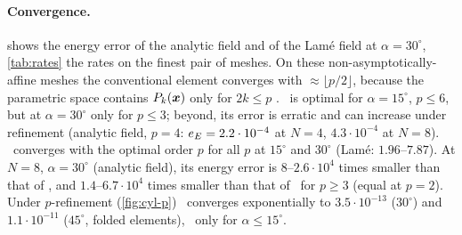 \begin{table}[t]
  \centering\small
  \caption{Thick cylinder, polynomial field (degree 5): maximum relative nodal error over $N=1,\dots,8$
    and $p=5,\dots,8$; in parentheses the number of rejected cases (singular interpolation matrix).}
  \label{tab:cylpoly}
  
\end{table}

\paragraph{Convergence.}  shows the energy error of the analytic field and of
the Lam\'e field at $\alpha=30^\circ$, \cref{tab:rates} the rates on the finest pair of meshes. On
these non-asymptotically-affine meshes the conventional element converges with
$\approx\lfloor p/2\rfloor$, because the parametric space contains $P_k(\bm{x})$ only for $2k\le p$
\cite{Arnold2002Approximation}. \PM\ is optimal for $\alpha=15^\circ$, $p\le6$, but at
$\alpha=30^\circ$ only for $p\le3$; beyond, its error is erratic and can increase under refinement
(analytic field, $p=4$: $e_{E}=2.2\cdot10^{-4}$ at $N=4$, $4.3\cdot10^{-4}$ at $N=8$). \PH\ converges with the
optimal order $p$ for all $p$ at $15^\circ$ and $30^\circ$ (Lam\'e: $1.96$--$7.87$). At $N=8$,
$\alpha=30^\circ$ (analytic field), its energy error is $8$--$2.6\cdot10^4$ times smaller than that of \PP,
and $1.4$--$6.7\cdot10^4$ times smaller than that of \PM\ for $p\ge3$ (equal at $p=2$). Under
$p$-refinement (\cref{fig:cyl-p}) \PH\ converges exponentially to $3.5\cdot10^{-13}$ ($30^\circ$) and
$1.1\cdot10^{-11}$ ($45^\circ$, folded elements), \PM\ only for $\alpha\le15^\circ$.


